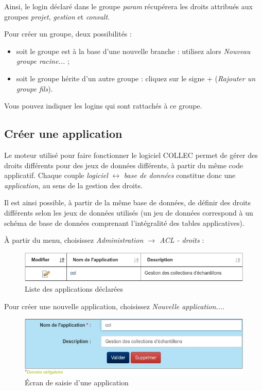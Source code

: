 Ainsi, le login déclaré dans le groupe \textit{param} récupérera les droits attribués aux groupes \textit{projet}, \textit{gestion} et \textit{consult}.

Pour créer un groupe, deux possibilités :
\begin{itemize}
\item soit le groupe est à la base d'une nouvelle branche : utilisez alors \textit{Nouveau groupe racine...} ;
\item soit le groupe hérite d'un autre groupe : cliquez sur le signe + (\textit{Rajouter un groupe fils}).
\end{itemize}

Vous pouvez indiquer les logins qui sont rattachés à ce groupe.


\subsection{Créer une application}
Le moteur utilisé pour faire fonctionner le logiciel COLLEC permet de gérer des droits différents pour des jeux de données différents, à partir du même code applicatif. Chaque couple \textit{logiciel} $\leftrightarrow$ \textit{base de données} constitue donc une \textit{application}, au sens de la gestion des droits.

Il est ainsi possible, à partir de la même base de données, de définir des droits différents selon les jeux de données utilisés (un jeu de données correspond à un schéma de base de données comprenant l'intégralité des tables applicatives).

À partir du menu, choisissez \textit{Administration $\rightarrow$ ACL - droits} :
\begin{figure}[H]
\includegraphics[width=\linewidth]{images/liste_appli}
\caption{Liste des applications déclarées}
\end{figure}

Pour créer une nouvelle application, choisissez \textit{Nouvelle application...}. 

\begin{figure}[H]
\includegraphics[width=\linewidth]{images/appli_change}
\caption{Écran de saisie d'une application}
\end{figure}

